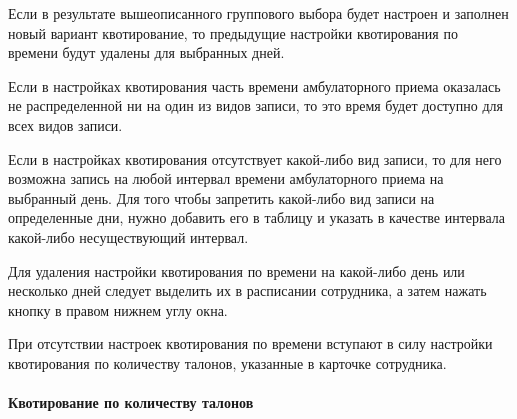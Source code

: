 Если в результате вышеописанного группового выбора будет настроен и заполнен новый вариант квотирование, то предыдущие настройки квотирования по времени будут удалены для выбранных дней.

\begin{vnim}
Если в настройках квотирования часть времени амбулаторного приема оказалась не распределенной ни на один из видов записи, то это время будет доступно для всех видов записи.
\end{vnim}
 
\begin{prim}
 Если в настройках квотирования отсутствует какой-либо вид записи, то для него возможна запись на любой интервал времени амбулаторного приема на выбранный день. Для того чтобы запретить какой-либо вид записи на определенные дни, нужно добавить его в таблицу  и указать в качестве интервала какой-либо несуществующий интервал.
\end{prim}

Для удаления настройки квотирования по времени на какой-либо день или несколько дней следует выделить их в расписании сотрудника, а затем нажать кнопку   в правом нижнем углу окна.

\begin{vnim}
 При отсутствии настроек квотирования по времени вступают в силу настройки квотирования по количеству талонов, указанные в карточке сотрудника.
\end{vnim}

\paragraph{Квотирование по количеству талонов}

